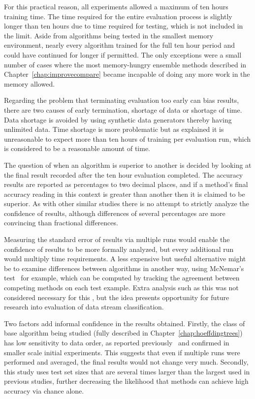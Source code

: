For this practical reason, all experiments allowed a maximum of ten hours training time. The time required for the entire evaluation process is slightly longer than ten hours due to time required for testing, which is not included in the limit. Aside from algorithms being tested in the smallest memory environment, nearly every algorithm trained for the full ten hour period and could have continued for longer if permitted. The only exceptions were a small number of cases where the most memory-hungry ensemble methods described in Chapter~\ref{chap:improvecompare} became incapable of doing any more work in the memory allowed.

Regarding the problem that terminating evaluation too early can bias results, there are two causes of early termination, shortage of data or shortage of time. Data shortage is avoided by using synthetic data generators thereby having unlimited data. Time shortage is more problematic but as explained it is unreasonable to expect more than ten hours of training per evaluation run, which is considered to be a reasonable amount of time.
\ENDOMIT

The question of when an algorithm is superior to another is decided by looking at the final result recorded after the ten hour evaluation completed. The accuracy results are reported as percentages to two decimal places, and if a method's final accuracy reading in this context is greater than another then it is claimed to be superior. As with other similar studies there is no attempt to strictly analyze the confidence of results, although differences of several percentages are more convincing than fractional differences.

Measuring the standard error of results via multiple runs would enable the confidence of results to be more formally analyzed, but every additional run would multiply time requirements. A less expensive but useful alternative might be to examine differences between algorithms in another way, using McNemar's test~\cite{mcnemar} for example, which can be computed by tracking the agreement between competing methods on each test example. Extra analysis such as this was not considered necessary for this \thesisc, but the idea presents opportunity for future research into evaluation of data stream classification.

\BEGINOMIT
Two factors add informal confidence in the results obtained. Firstly, the class of base algorithm being studied (fully described in Chapter~\ref{chap:hoeffdingtrees}) has low sensitivity to data order, as reported previously~\cite{stresstest,ufft} and confirmed in smaller scale initial experiments. This suggests that even if multiple runs were performed and averaged, the final results would not change very much. Secondly, this study uses test set sizes that are several times larger than the largest used in previous studies, further decreasing the likelihood that methods can achieve high accuracy via chance alone.

